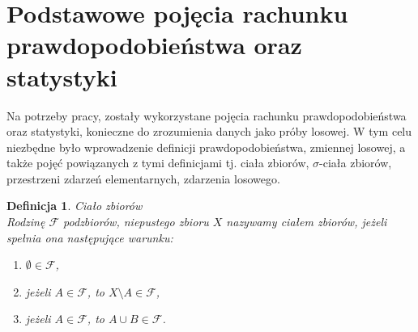 \documentclass[12pt,a4paper]{report}
\newtheorem{definition}[theorem]{Definicja}
\begin{document}
\begin{itemize}
\end{itemize}


\newpage



\section{Podstawowe pojęcia rachunku prawdopodobieństwa oraz statystyki}
\noindent

Na potrzeby pracy, zostały wykorzystane pojęcia rachunku prawdopodobieństwa oraz statystyki, konieczne do zrozumienia danych jako próby losowej. W tym celu niezbędne było wprowadzenie definicji prawdopodobieństwa, zmiennej losowej, a także pojęć powiązanych z tymi definicjami tj. ciała zbiorów, $\sigma$-ciała zbiorów, przestrzeni zdarzeń elementarnych, zdarzenia losowego.\\

\begin{definition}{Ciało zbiorów \cite[Rozdział 8.1]{rudnicki2006}\\}
Rodzinę $\mathcal{F}$ podzbiorów, niepustego zbioru $X$ nazywamy ciałem zbiorów, jeżeli spełnia ona następujące warunku: \\
\begin{enumerate}
\item $\emptyset \in \mathcal{F}$,
\item jeżeli $A \in \mathcal{F}$, to $X \setminus A \in \mathcal{F}$,
\item jeżeli $A \in \mathcal{F}$, to $A \cup B \in \mathcal{F}$.\\
\end{enumerate}
\end{definition}
\end{document}
